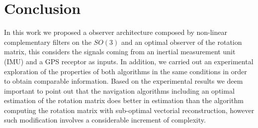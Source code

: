 \documentclass[10pt,conference]{IEEEtran}
\begin{document}
%






\section{Conclusion}
In this work we proposed a observer architecture composed by non-linear complementary filters on the $SO(3)$ and an optimal observer of the rotation matrix, this considers the signals coming from an inertial measurement unit (IMU)  and a GPS receptor as inputs. In addition, we carried out an experimental exploration of the properties of both algorithms in the same conditions in order to obtain comparable information. Based on the experimental results we deem  important to point out that the navigation algorithms including an optimal estimation of the rotation matrix does better in estimation than the algorithm computing the rotation matrix with sub-optimal vectorial reconstruction, however such modification involves a considerable increment of complexity. 
\end{document}
